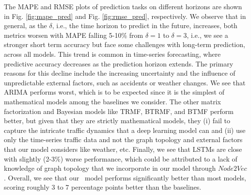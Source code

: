 The MAPE and RMSE plots of prediction tasks on different horizons are shown in Fig. \ref{fig:mape_pred} and Fig. \ref{fig:rmse_pred}, respectively. We observe that in general, as the $\delta$, i.e., the time horizon to predict in the future, increases, both metrics worsen with MAPE falling 5-10\% from $\delta=1$ to $\delta=3$, i.e., we see a stronger short term accuracy but face some challenges with long-term prediction, across all models. This trend is common in time-series forecasting, where predictive accuracy decreases as the prediction horizon extends. The primary reasons for this decline include the increasing uncertainty and the influence of unpredictable external factors, such as accidents or weather changes. We see that ARIMA performs worst, which is to be expected since it is the simplest of mathematical models among the baselines we consider. The other matrix factorization and Bayesian models like TRMF, BTRMF, and BTMF perform better, but given that they are strictly mathematical models, they (i) fail to capture the intricate traffic dynamics that a deep learning model can and (ii) use only the time-series traffic data and not the graph topology and external factors that our model considers like weather, etc. Finally, we see that LSTMs are close with slightly (2-3\%) worse performance, which could be attributed to a lack of knowledge of graph topology that we incorporate in our model through $Node2Vec$. Overall, we see that our \name\ model performs significantly better than most models, scoring roughly 3 to 7 percentage points better than the baselines.

